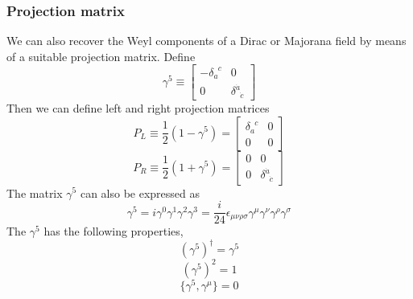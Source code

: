 \subsubsection{Projection matrix}
\noindent
We can also recover the Weyl components of a Dirac or Majorana field by means of a suitable projection matrix. Define
\[\gamma^5 \equiv \left[ \begin{matrix} -\delta_a^{\phantom{a}c}& 0\\ 0& \delta^{\dot{a}}_{\phantom{a}\dot{c}}\end{matrix} \right]\]
Then we can define left and right projection matrices
\[P_L \equiv \frac{1}{2}(1-\gamma^5) = \left[ \begin{matrix} \delta_a^{\phantom{a}c}& 0\\ 0& 0\end{matrix} \right]\]
\[P_R \equiv \frac{1}{2}(1+\gamma^5) = \left[ \begin{matrix} 0& 0\\ 0& \delta^{\dot{a}}_{\phantom{a}\dot{c}}\end{matrix} \right]\]
The matrix $\gamma^5$ can also be expressed as
\[\gamma^5 = i \gamma^0 \gamma^1 \gamma^2 \gamma^3 = \frac{i}{24} \epsilon_{\mu \nu \rho \sigma}\gamma^{\mu} \gamma^{\nu} \gamma^{\rho} \gamma^{\sigma}\]
The $\gamma^5$ has the following properties,
\[(\gamma^5)^{\dagger} = \gamma^5\]
\[(\gamma^5)^2 = 1\]
\[\{\gamma^5,\gamma^{\mu}\} = 0\]

